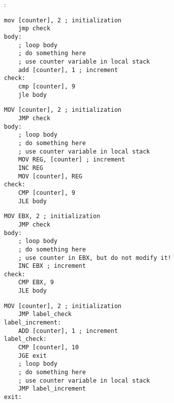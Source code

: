 ﻿\section{\Conclusion{}}

:

\begin{lstlisting}[caption=x86]
    mov [counter], 2 ; initialization
    jmp check
body:
    ; loop body
    ; do something here
    ; use counter variable in local stack
    add [counter], 1 ; increment
check:
    cmp [counter], 9
    jle body
\end{lstlisting}    


\begin{lstlisting}[caption=x86]
    MOV [counter], 2 ; initialization
    JMP check
body:
    ; loop body
    ; do something here
    ; use counter variable in local stack
    MOV REG, [counter] ; increment
    INC REG 
    MOV [counter], REG
check:
    CMP [counter], 9
    JLE body
\end{lstlisting}    


\begin{lstlisting}[caption=x86]
    MOV EBX, 2 ; initialization
    JMP check
body:
    ; loop body
    ; do something here
    ; use counter in EBX, but do not modify it!
    INC EBX ; increment
check:
    CMP EBX, 9
    JLE body
\end{lstlisting}    


\begin{lstlisting}[caption=x86]
    MOV [counter], 2 ; initialization
    JMP label_check
label_increment:
    ADD [counter], 1 ; increment
label_check:
    CMP [counter], 10
    JGE exit
    ; loop body
    ; do something here
    ; use counter variable in local stack
    JMP label_increment
exit:
\end{lstlisting}    

